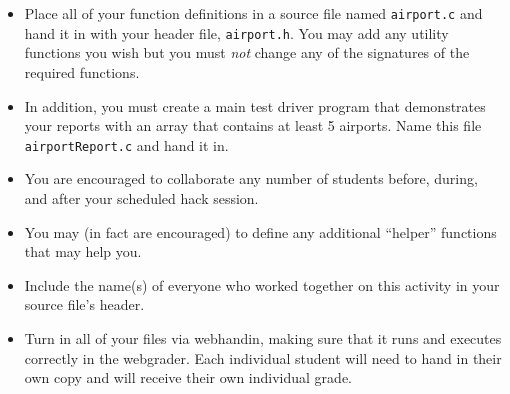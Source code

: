 \documentclass[12pt]{scrartcl}
\begin{document}
\begin{itemize}

  \item Place all of your function definitions in a source file named 
  \texttt{airport.c} and hand it in with your header file, 
  \texttt{airport.h}.  You may add any utility functions you
  wish but you must \emph{not} change any of the signatures of the required
  functions.
  
  \item In addition, you must create a main test driver program that 
  demonstrates your reports with an array that contains at least 5 
  airports. Name this file 
  \texttt{airportReport.c} and hand it in.

  \item You are encouraged to collaborate any number of students 
  before, during, and after your scheduled hack session.  

  \item You may (in fact are encouraged) to define any additional
  ``helper'' functions that may help you.

  \item Include the name(s) of everyone who worked together on
  this activity in your source file's header.

  \item Turn in all of your files via webhandin, making sure that 
  it runs and executes correctly in the webgrader.  Each individual 
  student will need to hand in their own copy and will receive 
  their own individual grade.
\end{itemize}  
\end{document}
